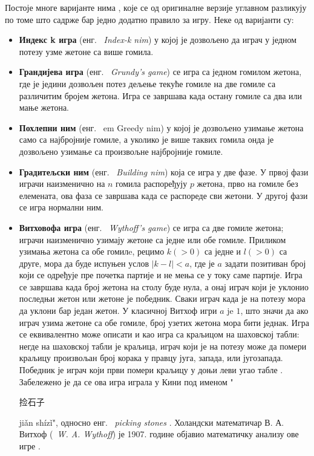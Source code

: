 \documentclass[a4paper]{article}
\begin{document}
Постоје многе варијанте нима \cite{nimvariants}, које се од оригиналне верзије углавном разликују по томе што садрже бар једно додатно правило за игру. Неке од варијанти су:
\begin{itemize}
	\item \textbf{Индекс k игра} (енг. {~\em Index-k nim}) у којој је дозвољено да играч у једном потезу узме жетоне са више гомила. 
	\item \textbf{Грандијева игра} (енг. {~\em Grundy's game}) се игра са једном гомилом жетона, где је једини дозвољен потез дељење текуће гомиле на две гомиле са различитим бројем жетона. Игра се завршава када остану гомиле са два или мање жетона.
	\item \textbf{Похлепни ним} (енг. {~em Greedy nim}) у којој је дозвољено узимање жетона само са најбројније гомиле, а уколико је више таквих гомила онда је дозвољено узимање са произвољне најбројније гомиле.
	\item \textbf{Градитељски ним} (енг. {~\em Building nim}) која се игра у две фазе. У првој фази играчи наизменично на $ n $ гомила распоређују $ p $ жетона, прво на гомиле без елемената, ова фаза се завршава када се распореде сви жетони. У другој фази се игра нормални ним. 
	\item \textbf{Витховофа игра} (енг. {~\em Wythoff's game}) \cite{wythoff1907modification} се игра са две гомиле жетона; играчи наизменично узимају жетоне са једне или обе гомиле. Приликом узимања жетона са обе гомилe, рецимо $ k (> 0) $ са једне и $ l (> 0) $ са друге, мора да буде испуњен услов $ |k - l| < a $, где је $ a $ задати позитиван број који се одређује пре почетка партије и не мења се у току саме партије. Игра се завршава када број жетона на столу буде нула, а онај играч који је уклонио последњи жетон или жетоне је победник. Сваки играч када је на потезу мора да уклони бар један жетон. У класичној Витхоф игри $ a $ je $ 1 $, што значи да ако играч узима жетоне са обе гомиле, број узетих жетона мора бити једнак. Игра се еквивалентно може описати и као игра са краљицом на шаховској табли: негде на шаховској табли је краљица, играч који је на потезу може да помери краљицу произвољан број корака у правцу југа, запада, или југозапада. Победник је играч који први помери краљицу у доњи леви угао табле \cite{cut-the-knot, singingbanana-youtube}. Забележено је да се ова игра играла у Кини  под именом "\begin{CJK}{UTF8}{gbsn}捡石子\end{CJK} jiǎn shízǐ", односно енг. {~\em picking stones} \cite{Yaglom}. Холандски математичар В. А. Витхоф ({~\em W. A. Wythoff}) је 1907. године објавио математичку анализу ове игре \cite{wythoff1907modification}. 
\end{itemize}
\end{document}
